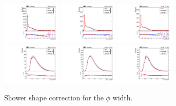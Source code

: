 \begin{figure}[htb]
	\centering
	\includegraphics[width=0.25\textwidth]{fig/ss_corr/phoPhiWidth_16_EB_Z.pdf}
	\includegraphics[width=0.25\textwidth]{fig/ss_corr/ph_sc_phiWidth_17_EB_Z.pdf}
	\includegraphics[width=0.25\textwidth]{fig/ss_corr/phoPhiWidth_18_EB_Z.pdf}\\
	\includegraphics[width=0.25\textwidth]{fig/ss_corr/phoPhiWidth_16_EE_Z.pdf}
	\includegraphics[width=0.25\textwidth]{fig/ss_corr/ph_sc_phiWidth_17_EE_Z.pdf}
	\includegraphics[width=0.25\textwidth]{fig/ss_corr/phoPhiWidth_18_EE_Z.pdf}\\	
	\label{fig:phiwidth_Z}
	\caption{Shower shape correction for the $\phi$ width.}
\end{figure}
